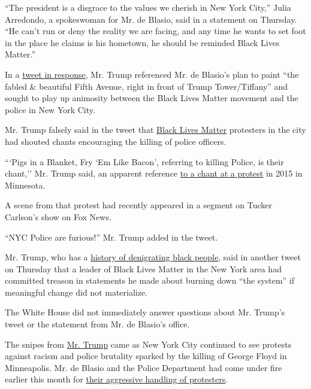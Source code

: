 ``The president is a disgrace to the values we cherish in New York
City,'' Julia Arredondo, a spokeswoman for Mr. de Blasio, said in a
statement on Thursday. ``He can't run or deny the reality we are facing,
and any time he wants to set foot in the place he claims is his
hometown, he should be reminded Black Lives Matter.''

In a
\href{https://twitter.com/realDonaldTrump/status/1276206200393064449}{tweet
in response}, Mr. Trump referenced Mr. de Blasio's plan to paint ``the
fabled \& beautiful Fifth Avenue, right in front of Trump
Tower/Tiffany'' and sought to play up animosity between the Black Lives
Matter movement and the police in New York City.

Mr. Trump falsely said in the tweet that
\href{https://www.nytimes3xbfgragh.onion/2020/07/09/nyregion/blm-trump-tower.html}{Black
Lives Matter} protesters in the city had shouted chants encouraging the
killing of police officers.

```Pigs in a Blanket, Fry `Em Like Bacon', referring to killing Police,
is their chant,'' Mr. Trump said, an apparent reference
\href{https://www.cbsnews.com/news/pigs-in-a-blanket-chant-at-minnesota-fair-riles-police/}{to
a chant at a protest} in 2015 in Minnesota.

A scene from that protest had recently appeared in a segment on Tucker
Carlson's show on Fox News.

``NYC Police are furious!'' Mr. Trump added in the tweet.

Mr. Trump, who has a
\href{https://www.nytimes3xbfgragh.onion/2020/06/23/us/politics/trump-race-racism-protests.html}{history
of denigrating black people}, said in another tweet on Thursday that a
leader of Black Lives Matter in the New York area had committed treason
in statements he made about burning down ``the system'' if meaningful
change did not materialize.

The White House did not immediately answer questions about Mr. Trump's
tweet or the statement from Mr. de Blasio's office.

The snipes from
\href{https://www.nytimes3xbfgragh.onion/2020/07/09/nyregion/blm-trump-tower.html}{Mr.
Trump} came as New York City continued to see protests against racism
and police brutality sparked by the killing of George Floyd in
Minneapolis. Mr. de Blasio and the Police Department had come under fire
earlier this month for
\href{https://www.nytimes3xbfgragh.onion/2020/06/17/nyregion/nypd-leticia-james-hearing-protests.html}{their
aggressive handling of protesters}.

